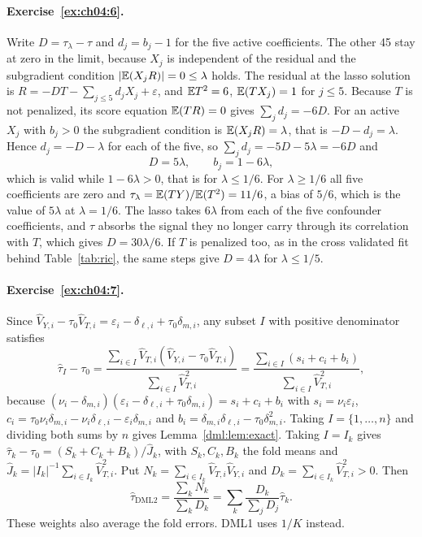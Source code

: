 \paragraph{Exercise~\ref{ex:ch04:6}.} Write $D = \tau_\lambda - \tau$ and $d_j = b_j - 1$ for the five active coefficients. The other 45 stay at zero in the limit, because $X_j$ is independent of the residual and the subgradient condition $|\mathbb{E}(X_j R)| = 0 \leq \lambda$ holds. The residual at the lasso solution is $R = -DT - \sum_{j \leq 5} d_j X_j + \varepsilon$, and $\mathbb{E} T^2 = 6$, $\mathbb{E}(TX_j) = 1$ for $j \leq 5$. Because $T$ is not penalized, its score equation $\mathbb{E}(TR) = 0$ gives $\sum_j d_j = -6D$. For an active $X_j$ with $b_j > 0$ the subgradient condition is $\mathbb{E}(X_j R) = \lambda$, that is $-D - d_j = \lambda$. Hence $d_j = -D - \lambda$ for each of the five, so $\sum_j d_j = -5D - 5\lambda = -6D$ and
\[
D = 5\lambda, \qquad b_j = 1 - 6\lambda,
\]
which is valid while $1 - 6\lambda > 0$, that is for $\lambda \leq 1/6$. For $\lambda \geq 1/6$ all five coefficients are zero and $\tau_\lambda = \mathbb{E}(TY)/\mathbb{E}(T^2) = 11/6$, a bias of $5/6$, which is the value of $5\lambda$ at $\lambda = 1/6$. The lasso takes $6\lambda$ from each of the five confounder coefficients, and $\tau$ absorbs the signal they no longer carry through its correlation with $T$, which gives $D = 30\lambda/6$. If $T$ is penalized too, as in the cross validated fit behind Table~\ref{tab:ric}, the same steps give $D = 4\lambda$ for $\lambda \leq 1/5$.

\paragraph{Exercise~\ref{ex:ch04:7}.} Since $\hat V_{Y,i}-\tau_0\hat V_{T,i}=\varepsilon_i-\delta_{\ell,i}+\tau_0\delta_{m,i}$, any subset $I$ with positive denominator satisfies
\[
\hat\tau_I-\tau_0=\frac{\sum_{i\in I}\hat V_{T,i}(\hat V_{Y,i}-\tau_0\hat V_{T,i})}{\sum_{i\in I}\hat V_{T,i}^2}
=\frac{\sum_{i\in I}(s_i+c_i+b_i)}{\sum_{i\in I}\hat V_{T,i}^2},
\]
because $(\nu_i-\delta_{m,i})(\varepsilon_i-\delta_{\ell,i}+\tau_0\delta_{m,i})=s_i+c_i+b_i$ with $s_i=\nu_i\varepsilon_i$, $c_i=\tau_0\nu_i\delta_{m,i}-\nu_i\delta_{\ell,i}-\varepsilon_i\delta_{m,i}$ and $b_i=\delta_{m,i}\delta_{\ell,i}-\tau_0\delta_{m,i}^2$. Taking $I=\{1,\dots,n\}$ and dividing both sums by $n$ gives Lemma~\ref{dml:lem:exact}. Taking $I=I_k$ gives $\hat\tau_k-\tau_0=(S_k+C_k+B_k)/\hat J_k$, with $S_k,C_k,B_k$ the fold means and $\hat J_k=|I_k|^{-1}\sum_{i\in I_k}\hat V_{T,i}^2$. Put $N_k=\sum_{i\in I_k}\hat V_{T,i}\hat V_{Y,i}$ and $D_k=\sum_{i\in I_k}\hat V_{T,i}^2>0$. Then
\[
\hat\tau_{\mathrm{DML2}}=\frac{\sum_kN_k}{\sum_kD_k}=\sum_k\frac{D_k}{\sum_jD_j}\hat\tau_k.
\]
These weights also average the fold errors. DML1 uses $1/K$ instead.

